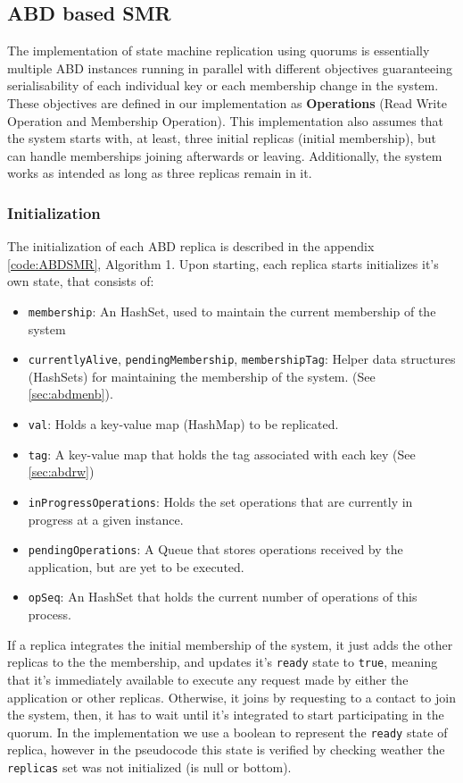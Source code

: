 \documentclass[10pt,a4paper,twocolumn]{article}
\begin{document}
\subsection{ABD based SMR}
\label{sec:ABDImpl}
The implementation of state machine replication using quorums is essentially multiple ABD instances running in parallel with different objectives guaranteeing serialisability of each individual key or each membership change in the system. These objectives are defined in our implementation as \textbf{Operations} (Read Write Operation and Membership Operation). This implementation also assumes that the system starts with, at least, three initial replicas (initial membership), but can handle memberships joining afterwards or leaving. Additionally, the system works as intended as long as three replicas remain in it.
\subsubsection{Initialization}
\label{sec:initABD}
The initialization of each ABD replica is described in the appendix \ref{code:ABDSMR}, Algorithm 1. Upon starting, each replica starts initializes it's own state, that consists of:
\begin{itemize}
	\setlength\itemsep{0em}
	\item \verb|membership|: An HashSet, used to maintain the current membership of the system
	\item \verb|currentlyAlive|, \verb|pendingMembership|, \verb|membershipTag|: Helper data structures (HashSets) for maintaining the membership of the system. (See \ref{sec:abdmenb}).
	\item \verb|val|: Holds a key-value map (HashMap) to be replicated.
	\item \verb|tag|: A key-value map that holds the tag associated with each key (See \ref{sec:abdrw})
	\item \verb|inProgressOperations|: Holds the set operations that are currently in progress at a given instance.
	\item \verb|pendingOperations|: A Queue that stores operations received by the application, but are yet to be executed.
	\item \verb|opSeq|: An HashSet that holds the current number of operations of this process.
\end{itemize}
\par If a replica integrates the initial membership of the system, it just adds the other replicas to the the membership, and updates it's \verb|ready| state to \verb|true|, meaning that it's immediately available to execute any request made by either the application or other replicas. Otherwise, it joins by requesting to a contact to join the system, then, it has to wait until it's integrated to start participating in the quorum. In the implementation we use a boolean to represent the \verb|ready| state of replica, however in the pseudocode this state is verified by checking weather the \verb|replicas| set was not initialized (is null or bottom).
\end{document}
